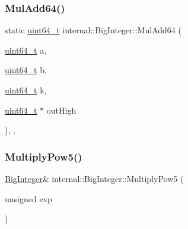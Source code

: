 \mbox{\label{classinternal_1_1BigInteger_a3857418321694cd20071203b2f08ebfe}} 
\subsubsection{\texorpdfstring{Mul\+Add64()}{MulAdd64()}}
{\footnotesize\ttfamily static \hyperlink{stdint_8h_aec6fcb673ff035718c238c8c9d544c47}{uint64\+\_\+t} internal\+::\+Big\+Integer\+::\+Mul\+Add64 (\begin{DoxyParamCaption}\item[{\hyperlink{stdint_8h_aec6fcb673ff035718c238c8c9d544c47}{uint64\+\_\+t}}]{a,  }\item[{\hyperlink{stdint_8h_aec6fcb673ff035718c238c8c9d544c47}{uint64\+\_\+t}}]{b,  }\item[{\hyperlink{stdint_8h_aec6fcb673ff035718c238c8c9d544c47}{uint64\+\_\+t}}]{k,  }\item[{\hyperlink{stdint_8h_aec6fcb673ff035718c238c8c9d544c47}{uint64\+\_\+t} $\ast$}]{out\+High }\end{DoxyParamCaption})\hspace{0.3cm}{\ttfamily [inline]}, {\ttfamily [static]}, {\ttfamily [private]}}

\mbox{\label{classinternal_1_1BigInteger_a98a13f169c27d1acfa57054f37c61763}} 
\subsubsection{\texorpdfstring{Multiply\+Pow5()}{MultiplyPow5()}}
{\footnotesize\ttfamily \hyperlink{classinternal_1_1BigInteger}{Big\+Integer}\& internal\+::\+Big\+Integer\+::\+Multiply\+Pow5 (\begin{DoxyParamCaption}\item[{unsigned}]{exp }\end{DoxyParamCaption})\hspace{0.3cm}{\ttfamily [inline]}}

\mbox{\label{classinternal_1_1BigInteger_a79a52c6135c9783f2e53432dce2cde89}} 
